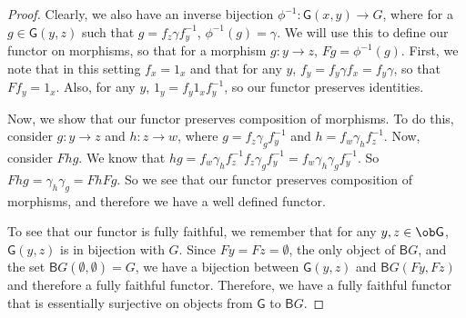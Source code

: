 \documentclass[../../main]{subfiles}
\begin{document}
\begin{proof}
	Clearly, we also have an inverse bijection $\phi^{-1}\colon \textsf{G}(x,y)
	\rightarrow G$, where for a $g \in \textsf{G}(y,z)$ such that $g = f_z\gamma
	f_y^{-1}$, $\phi^{-1}(g) = \gamma$. We will use this to define our functor
	on morphisms, so that for a morphism $g\colon y\rightarrow z$, $Fg =
	\phi^{-1}(g)$. First, we note that in this setting $f_x = 1_x$ and that for
	any $y$, $f_y = f_y\gamma f_x = f_y\gamma$, so that $Ff_y = 1_x$. Also, for
	any $y$, $1_y = f_y 1_x f_y^{-1}$, so our functor preserves identities.

	Now, we show that our functor preserves composition of morphisms. To do
	this, consider $g\colon y\rightarrow z$ and $h\colon z \rightarrow w$, where $g =
	f_z\gamma_gf_y^{-1}$ and $h = f_w\gamma_hf_z^{-1}$. Now, consider $Fhg$. We
	know that $hg = f_w\gamma_hf_z^{-1}f_z\gamma_gf_y^{-1} =
	f_w\gamma_h\gamma_gf_y^{-1}$. So $Fhg = \gamma_h\gamma_g = FhFg$. So we see
	that our functor preserves composition of morphisms, and therefore we have a
	well defined functor.

	To see that our functor is fully faithful, we remember that for any $y,z \in
	\ob\textsf{G}$, $\textsf{G}(y,z)$ is in bijection with $G$. Since $Fy = Fz =
	\emptyset$, the only object of $\textsf{B}G$, and the set
	$\textsf{B}G(\emptyset, \emptyset) = G$, we have a bijection between
	$\textsf{G}(y,z)$ and $\textsf{B}G(Fy, Fz)$ and therefore a fully faithful
	functor. Therefore, we have a fully faithful functor that is essentially
	surjective on objects from $\textsf{G}$ to $\textsf{B}G$.


\end{proof}
\end{document}

